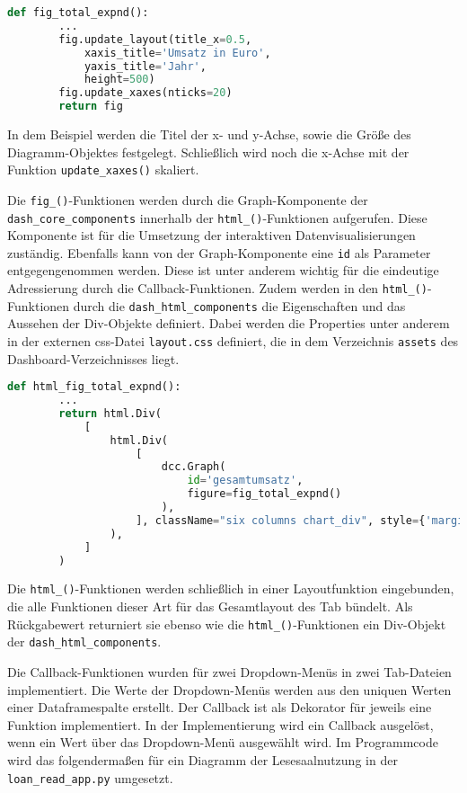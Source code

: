     \begin{lstlisting}[language=Python, caption=fig\_total\_expnd() Auszug 2]  
    def fig_total_expnd():
        ...
        fig.update_layout(title_x=0.5,
            xaxis_title='Umsatz in Euro',
            yaxis_title='Jahr',
            height=500)
        fig.update_xaxes(nticks=20)         
        return fig
    \end{lstlisting}

    In dem Beispiel werden die Titel der x- und y-Achse, sowie die
    Größe des Diagramm-Objektes festgelegt. Schließlich wird noch die x-Achse mit der Funktion \texttt{update\_xaxes()} skaliert.
    
    Die \texttt{fig\_()}-Funktionen werden durch die Graph-Komponente der \texttt{dash\_core\_components} innerhalb der 
    \texttt{html\_()}-Funktionen aufgerufen. Diese Komponente ist für die Umsetzung der interaktiven Datenvisualisierungen 
    zuständig. Ebenfalls kann von der Graph-Komponente eine \texttt{id} als Parameter entgegengenommen werden. 
    Diese ist unter anderem wichtig für die eindeutige Adressierung durch die Callback-Funktionen.
    Zudem werden in den \texttt{html\_()}-Funktionen durch die \texttt{dash\_html\_components} die Eigenschaften und 
    das Aussehen der Div-Objekte definiert. 
    Dabei werden die Properties unter anderem in der externen css-Datei \texttt{layout.css} definiert, die in dem Verzeichnis \texttt{assets} 
    des Dashboard-Verzeichnisses liegt.

    \begin{lstlisting}[language=Python, caption={html\_fig\_total\_expnd()}] 
        def html_fig_total_expnd():
        ...
        return html.Div(
            [
                html.Div(
                    [
                        dcc.Graph(
                            id='gesamtumsatz',
                            figure=fig_total_expnd()
                        ),
                    ], className="six columns chart_div", style={'margin-top': '20px', 'margin-left': '10px'}
                ),
            ]
        )
        \end{lstlisting}
    
    Die \texttt{html\_()}-Funktionen werden schließlich in einer Layoutfunktion eingebunden, die alle Funktionen dieser Art
    für das Gesamtlayout des Tab bündelt. Als Rückgabewert returniert sie ebenso wie die \texttt{html\_()}-Funktionen ein Div-Objekt der \texttt{dash\_html\_components}.


    Die Callback-Funktionen wurden für zwei Dropdown-Menüs in zwei Tab-Dateien implementiert.
    Die Werte der Dropdown-Menüs werden aus den uniquen Werten einer Dataframespalte erstellt.
    Der Callback ist als Dekorator für jeweils eine Funktion implementiert. 
    In der Implementierung wird ein Callback ausgelöst, wenn ein Wert über das Dropdown-Menü ausgewählt wird.
    Im Programmcode wird das folgendermaßen für ein Diagramm der Lesesaalnutzung in der \texttt{loan\_read\_app.py} umgesetzt.

